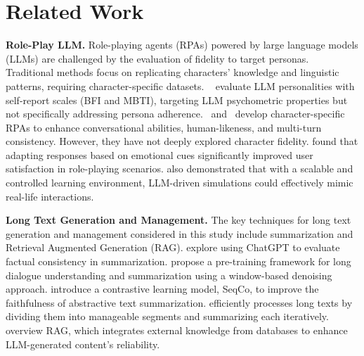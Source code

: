 \section{Related Work}

\noindent\textbf{Role-Play LLM.} Role-playing agents (RPAs) powered by large language models (LLMs) are challenged by the evaluation of fidelity to target personas. Traditional methods focus on replicating characters' knowledge and linguistic patterns, requiring character-specific datasets. ~\citet{huang2023psychobench} evaluate LLM personalities with self-report scales (BFI and MBTI), targeting LLM psychometric properties but not specifically addressing persona adherence.~\citet{li2023chatharuhi} and~\citet{wang2023rolellm} develop character-specific RPAs to enhance conversational abilities, human-likeness, and multi-turn consistency. 
However, they have not deeply explored character fidelity. 
\citet{tao2024chatgpt} found that adapting responses based on emotional cues significantly improved user satisfaction in role-playing scenarios. \citet{tao2023rolecraft} also demonstrated that with a scalable and controlled learning environment, LLM-driven simulations could effectively mimic real-life interactions.

\noindent\textbf{Long Text Generation and Management.}
The key techniques for long text generation and management considered in this study include summarization and Retrieval Augmented Generation (RAG).
\citet{luo2023chatgpt} explore using ChatGPT to evaluate factual consistency in summarization. \citet{zhong2022dialoglm} propose a pre-training framework for long dialogue understanding and summarization using a window-based denoising approach. \citet{xu2022sequence} introduce a contrastive learning model, SeqCo, to improve the faithfulness of abstractive text summarization. \citet{zhang2021summ} efficiently processes long texts by dividing them into manageable segments and summarizing each iteratively.
\citet{gao2023retrieval} overview RAG, which integrates external knowledge from databases to enhance LLM-generated content's reliability. 

